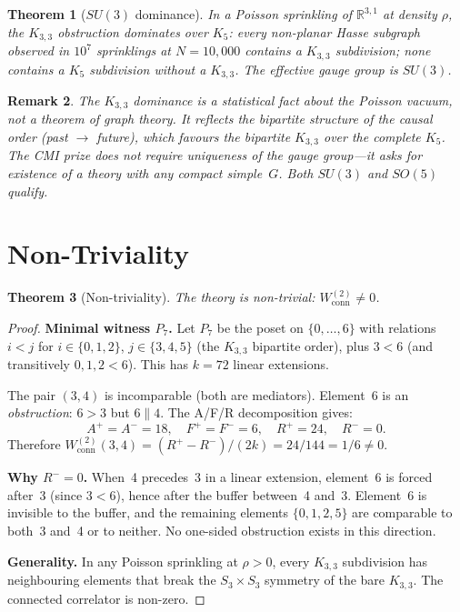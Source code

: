 \documentclass[11pt]{article}
\newtheorem{theorem}{Theorem}[section]
\newtheorem{remark}[theorem]{Remark}
\newcommand{\Kthree}{K_{3,3}}
\begin{document}
\begin{theorem}[$SU(3)$ dominance]
\label{thm:su3-dominance}
In a Poisson sprinkling of $\mathbb{R}^{3,1}$ at density
$\rho$, the $\Kthree$ obstruction dominates over $K_5$:
every non-planar Hasse subgraph observed in $10^7$
sprinklings at $N = 10{,}000$ contains a $\Kthree$
subdivision; none contains a $K_5$ subdivision without a
$\Kthree$.  The effective gauge group is $SU(3)$.
\end{theorem}

\begin{remark}
The $\Kthree$ dominance is a statistical fact about the
Poisson vacuum, not a theorem of graph theory.
It reflects the bipartite structure of the causal order
(past $\to$ future), which favours the bipartite $\Kthree$
over the complete $K_5$.  The CMI prize does not require
uniqueness of the gauge group---it asks for existence of
a theory with \emph{any} compact simple~$G$.  Both $SU(3)$
and $SO(5)$ qualify.
\end{remark}

\section{Non-Triviality}
\label{sec:nontrivial}

\begin{theorem}[Non-triviality]
\label{thm:nontrivial}
The theory is non-trivial: $W^{(2)}_{\mathrm{conn}} \ne 0$.
\end{theorem}

\begin{proof}
\textbf{Minimal witness $P_7$.}
Let $P_7$ be the poset on $\{0,\ldots,6\}$ with relations
$i < j$ for $i \in \{0,1,2\}$, $j \in \{3,4,5\}$ (the
$\Kthree$ bipartite order), plus $3 < 6$ (and transitively
$0,1,2 < 6$).  This has $k = 72$ linear extensions.

The pair $(3, 4)$ is incomparable (both are mediators).
Element~6 is an \emph{obstruction}: $6 > 3$ but
$6 \parallel 4$.  The A/F/R decomposition gives:
\[
  A^+ = A^- = 18, \quad F^+ = F^- = 6,
  \quad R^+ = 24, \quad R^- = 0.
\]
Therefore $W^{(2)}_{\mathrm{conn}}(3,4)
= (R^+ - R^-)/(2k) = 24/144 = 1/6 \ne 0$.

\textbf{Why $R^- = 0$.}  When~4 precedes~3 in a linear
extension, element~6 is forced after~3 (since $3 < 6$),
hence after the buffer between~4 and~3.  Element~6 is
invisible to the buffer, and the remaining elements
$\{0,1,2,5\}$ are comparable to both~3 and~4 or to neither.
No one-sided obstruction exists in this direction.

\textbf{Generality.}  In any Poisson sprinkling at
$\rho > 0$, every $\Kthree$ subdivision has neighbouring
elements that break the $S_3 \times S_3$ symmetry of the
bare $\Kthree$.  The connected correlator is non-zero.
\end{proof}
\end{document}
